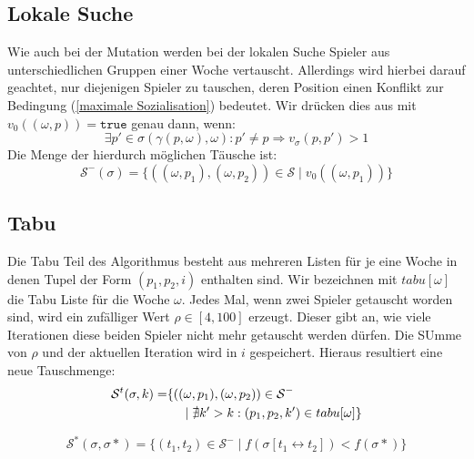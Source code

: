 \subsection{Lokale Suche}
Wie auch bei der Mutation werden bei der lokalen Suche Spieler aus unterschiedlichen Gruppen einer Woche vertauscht. 
Allerdings wird hierbei darauf geachtet, nur diejenigen Spieler zu tauschen, deren Position einen Konflikt zur  Bedingung (\ref{maximale Sozialisation}) bedeutet. 
Wir drücken dies aus mit $v_0((\omega, p)) = \texttt{true}$ genau dann, wenn:
\begin{equation}
  \exists p' \in \sigma(\gamma(p,\omega), \omega): p' \neq p \Rightarrow v_\sigma(p, p') > 1
\end{equation}
Die Menge der hierdurch möglichen Täusche ist:
\begin{equation}
  \mathcal{S}^-(\sigma) = \{ ((\omega, p_1), (\omega, p_2)) \in \mathcal{S} \;|\; v_0((\omega, p_1)) \}
\end{equation}


\subsection{Tabu}
Die Tabu Teil des Algorithmus besteht aus mehreren Listen für je eine Woche in denen Tupel der Form $(p_1, p_2, i)$ enthalten sind. Wir bezeichnen mit $tabu[\omega]$ die Tabu Liste für die Woche $\omega$. 
Jedes Mal, wenn zwei Spieler getauscht worden sind, wird ein zufälliger Wert $\rho \in [4, 100]$ erzeugt. Dieser gibt an, wie viele Iterationen diese beiden Spieler nicht mehr getauscht werden dürfen. Die SUmme von $\rho$ und der aktuellen Iteration wird in $i$ gespeichert. Hieraus resultiert eine neue Tauschmenge:
\begin{equation}
\begin{split} 
  \mathcal{S}^t(\sigma, k) = & \{ ((\omega, p_1), (\omega, p_2)) \in \mathcal{S}^- \\
    & \hspace{5 mm} | \; \nexists k' > k: (p_1, p_2, k') \in tabu[\omega] \}
\end{split} 
\end{equation}


\begin{equation}
  \mathcal{S}^*(\sigma, \sigma*) = \{ (t_1, t_2) \in \mathcal{S}^- \;|\; f(\sigma [t_1 \leftrightarrow t_2] ) < f(\sigma *) \}
\end{equation}

